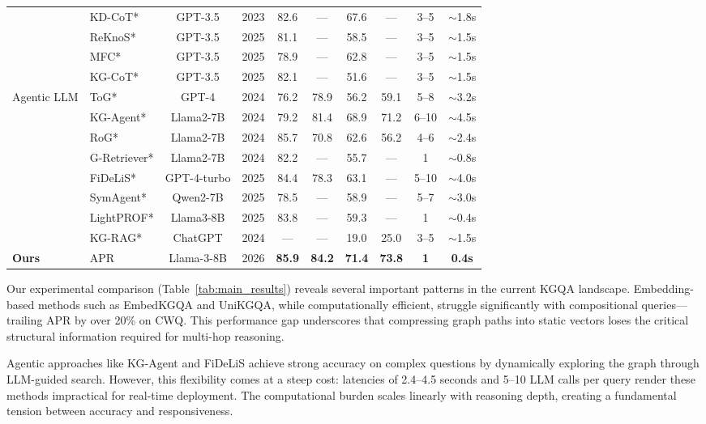 \documentclass[conference]{IEEEtran}
\newcommand{\model}{\textsc{APR}}
\begin{document}
\begin{table}[t]
\begin{tabular}{llcccccccc}
& KD-CoT* \cite{wang2023kdcot} & GPT-3.5 & 2023 & 82.6 & --- & 67.6 & --- & 3--5 & $\sim$1.8s \\
& ReKnoS* \cite{wang2025reknos} & GPT-3.5 & 2025 & 81.1 & --- & 58.5 & --- & 3--5 & $\sim$1.5s \\
& MFC* \cite{liang2025mfc} & GPT-3.5 & 2025 & 78.9 & --- & 62.8 & --- & 3--5 & $\sim$1.5s \\
& KG-CoT* \cite{zhang2025kgcot} & GPT-3.5 & 2025 & 82.1 & --- & 51.6 & --- & 3--5 & $\sim$1.5s \\
\midrule
\multirow{8}{*}{Agentic LLM}
& ToG* \cite{sun2024tog} & GPT-4 & 2024 & 76.2 & 78.9 & 56.2 & 59.1 & 5--8 & $\sim$3.2s \\
& KG-Agent* \cite{jiang2024kgagent} & Llama2-7B & 2024 & 79.2 & 81.4 & 68.9 & 71.2 & 6--10 & $\sim$4.5s \\
& RoG* \cite{luo2024rog} & Llama2-7B & 2024 & 85.7 & 70.8 & 62.6 & 56.2 & 4--6 & $\sim$2.4s \\
& G-Retriever* \cite{he2024gretriever} & Llama2-7B & 2024 & 82.2 & --- & 55.7 & --- & 1 & $\sim$0.8s \\
& FiDeLiS* \cite{sui2025fidelis} & GPT-4-turbo & 2025 & 84.4 & 78.3 & 63.1 & --- & 5--10 & $\sim$4.0s \\
& SymAgent* \cite{liu2025symagent} & Qwen2-7B & 2025 & 78.5 & --- & 58.9 & --- & 5--7 & $\sim$3.0s \\
& LightPROF* \cite{ao2025lightprof} & Llama3-8B & 2025 & 83.8 & --- & 59.3 & --- & 1 & $\sim$0.4s \\
& KG-RAG* \cite{shu2024kgrag} & ChatGPT & 2024 & --- & --- & 19.0 & 25.0 & 3--5 & $\sim$1.5s \\
\midrule
\textbf{Ours} & \model{} & Llama-3-8B & 2026 & \textbf{85.9} & \textbf{84.2} & \textbf{71.4} & \textbf{73.8} & \textbf{1} & \textbf{0.4s} \\
\bottomrule
\end{tabular}
\end{table}

Our experimental comparison (Table~\ref{tab:main_results}) reveals several important patterns in the current KGQA landscape. Embedding-based methods such as EmbedKGQA and UniKGQA, while computationally efficient, struggle significantly with compositional queries---trailing \model{} by over 20\% on CWQ. This performance gap underscores that compressing graph paths into static vectors loses the critical structural information required for multi-hop reasoning.

Agentic approaches like KG-Agent and FiDeLiS achieve strong accuracy on complex questions by dynamically exploring the graph through LLM-guided search. However, this flexibility comes at a steep cost: latencies of 2.4--4.5 seconds and 5--10 LLM calls per query render these methods impractical for real-time deployment. The computational burden scales linearly with reasoning depth, creating a fundamental tension between accuracy and responsiveness.
\end{document}
